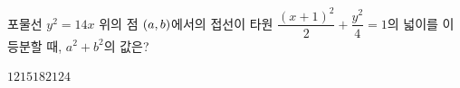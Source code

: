 포물선 $y^2=14x$ 위의 점 $(a{,}\mkern3mu\mathopen{}b)$에서의 접선이 타원 $\dfrac{(x+1)^2}{2}+\dfrac{y^2}{4}=1$의 넓이를 이등분할 때, $a^2+b^2$의 값은?
\begin{choices32}{$12$}{$15$}{$18$}{$21$}{$24$}\end{choices32}
